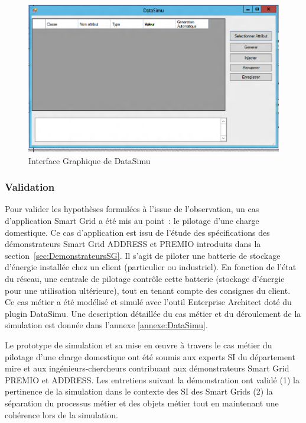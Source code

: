 				\begin{figure}[!ht]
 \begin{center}
  \includegraphics[width=1\textwidth]{figures/6_methodologie/data_simu.png}
 \end{center}
 \caption{Interface Graphique de DataSimu}
 \label{fig:data_simu}
\end{figure}
				
			\subsubsection{Validation}
			Pour valider les hypothèses formulées à l'issue de l'observation, un cas d'application Smart Grid a été mis au point~: le pilotage d'une charge domestique. Ce cas d'application est issu de l'étude des spécifications des démonstrateurs Smart Grid ADDRESS et PREMIO introduits dans la section~\ref{sec:DemonstrateursSG}. Il s'agit de piloter une batterie de stockage d'énergie installée chez un client (particulier ou industriel). En fonction de l'état du réseau, une centrale de pilotage contrôle cette batterie (stockage d'énergie pour une utilisation ultérieure), tout en tenant compte des consignes du client. Ce cas métier a été modélisé et simulé avec l'outil Enterprise Architect doté du plugin DataSimu. Une description détaillée du cas métier et du déroulement de la simulation est donnée dans l'annexe \ref{annexe:DataSimu}. 
			
			Le prototype de simulation et sa mise en œuvre à travers le cas métier du pilotage d'une charge domestique ont été soumis aux experts SI du département \gls{mire} et aux ingénieurs-chercheurs contribuant aux démonstrateurs Smart Grid PREMIO et ADDRESS. Les entretiens suivant la démonstration ont validé (1) la pertinence de la simulation dans le contexte des SI des Smart Grids (2) la séparation du processus métier et des objets métier tout en maintenant une cohérence lors de la simulation. 
			
